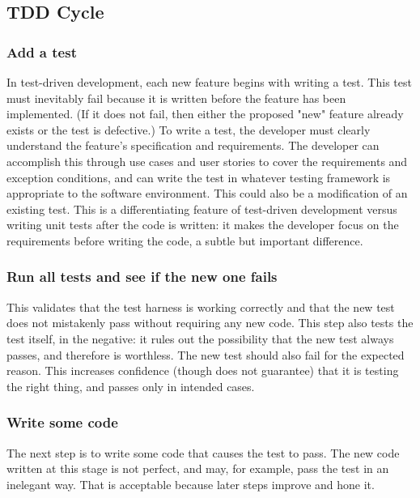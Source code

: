 \subsection{TDD Cycle}

\subsubsection{Add a test}

In test-driven development, each new feature begins with writing a test. This test must inevitably fail because it is written before the feature has been implemented. (If it does not fail, then either the proposed "new" feature already exists or the test is defective.) To write a test, the developer must clearly understand the feature's specification and requirements. The developer can accomplish this through use cases and user stories to cover the requirements and exception conditions, and can write the test in whatever testing framework is appropriate to the software environment. This could also be a modification of an existing test. This is a differentiating feature of test-driven development versus writing unit tests after the code is written: it makes the developer focus on the requirements before writing the code, a subtle but important difference.

\subsubsection{Run all tests and see if the new one fails}

This validates that the test harness is working correctly and that the new test does not mistakenly pass without requiring any new code. This step also tests the test itself, in the negative: it rules out the possibility that the new test always passes, and therefore is worthless. The new test should also fail for the expected reason. This increases confidence (though does not guarantee) that it is testing the right thing, and passes only in intended cases.

\subsubsection{Write some code}

The next step is to write some code that causes the test to pass. The new code written at this stage is not perfect, and may, for example, pass the test in an inelegant way. That is acceptable because later steps improve and hone it.

